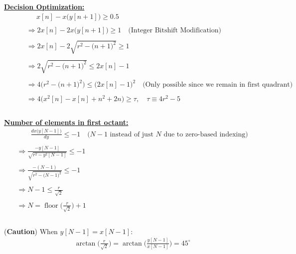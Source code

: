 \documentclass{article}
\DeclareMathOperator{\floor}{floor}
\begin{document}
\underline{\textbf{Decision Optimization:}}
\begin{align*}
    &\quad \quad \quad \ \ x[n] - x\Big(y[n + 1]\Big) \geq 0.5 \\ \\
    &\quad \quad \Rightarrow 2x[n] - 2x\Big(y[n + 1]\Big) \geq 1 \quad \big(\text{Integer Bitshift Modification}\big) \\ \\
    &\quad \quad \Rightarrow 2x[n] - 2\sqrt{r^{2} - \big(n + 1\big)^{2}} \geq 1 \\ \\
    &\quad \quad \Rightarrow 2\sqrt{r^{2} - \big(n + 1\big)^{2}} \leq 2x[n] - 1 \\ \\
    &\quad \quad \Rightarrow 4\Big(r^{2} - \big(n + 1\big)^{2}\Big) \leq \Big(2x[n] - 1\Big)^{2} \quad \big(\text{Only possible since we remain in first quadrant}\big) \\ \\
    &\quad \quad \Rightarrow 4\Big(x^{2}[n] - x[n] + n^{2} + 2n\Big) \geq \tau, \quad \tau \equiv 4r^{2} - 5 \\ \\
\end{align*}

\underline{\textbf{Number of elements in first octant:}}
\begin{align*}
    &\quad \quad \frac{dx\Big(y[N - 1]\Big)}{dy} \leq -1 \quad \big(N - 1 \text{ instead of just } N \text{ due to zero-based indexing}\big) \\ \\
    &\Rightarrow \frac{-y[N - 1]}{\sqrt{r^{2} - y^{2}[N - 1]}} \leq -1 \\ \\
    &\Rightarrow \frac{-(N - 1)}{\sqrt{r^{2} - \big(N - 1\big)^{2}}} \leq -1 \\ \\
    &\Rightarrow N - 1 \leq \frac{r}{\sqrt{2}} \\ \\
    &\Rightarrow N = \floor\Bigg(\frac{r}{\sqrt{2}}\Bigg) + 1\\ \\
\end{align*}

\big(\textbf{Caution}\big) When $y[N - 1] = x[N - 1]$:
\begin{align*}
    & \arctan\Bigg(\frac{r}{\sqrt{2}}\Bigg) = \arctan\Bigg(\frac{y[N - 1]}{x[N - 1]}\Bigg) = 45^{\circ} \\
\end{align*}
\end{document}
